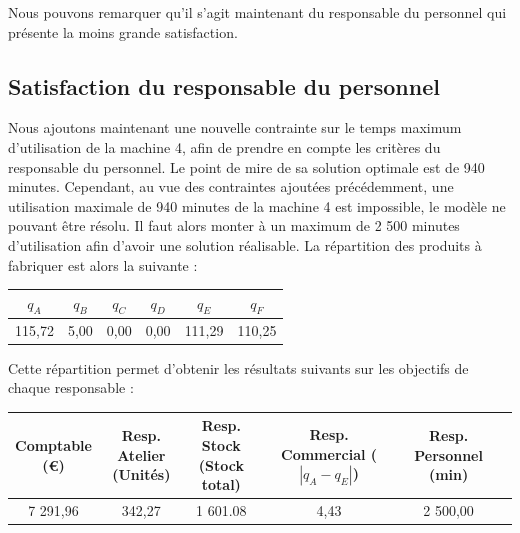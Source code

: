 \documentclass[paper=a4, fontsize=11pt]{report}
\numberwithin{equation}{section}		%
\numberwithin{figure}{section}			%
\numberwithin{table}{section}				%
\newcommand\abs[1]{\left|#1\right|}
\begin{document}
Nous pouvons remarquer qu'il s'agit maintenant du responsable du personnel qui présente la moins grande satisfaction.

\subsection{Satisfaction du responsable du personnel}

Nous ajoutons maintenant une nouvelle contrainte sur le temps maximum d'utilisation de la machine 4, afin de prendre en compte les critères du responsable du personnel. Le point de mire de sa solution optimale est de 940 minutes. Cependant, au vue des contraintes ajoutées précédemment, une utilisation maximale de 940 minutes de la machine 4 est impossible, le modèle ne pouvant être résolu. Il faut alors monter à un maximum de 2 500 minutes d'utilisation afin d'avoir une solution réalisable. La répartition des produits à fabriquer est alors la suivante :

\begin{center}
\begin{tabular}{cccccc}
\hline
$q_A$ & $q_B$ & $q_C$ & $q_D$ & $q_E$ & $q_F$ \\
\hline
115,72 & 5,00 & 0,00 & 0,00 & 111,29 & 110,25 \\
\hline
\end{tabular}
\end{center}

Cette répartition permet d'obtenir les résultats suivants sur les objectifs de chaque responsable : 

\begin{table}[H]
\begin{center}
\begin{tabular}{c|ccccc}
\shortstack{Comptable \\ \scriptsize{(€)}} & \shortstack{Resp. Atelier \\ \scriptsize (Unités)} & \shortstack{Resp.  Stock \\ \scriptsize (Stock total)} & \shortstack{Resp.  Commercial \\ \scriptsize ($\abs{q_A - q_E}$)} &   \shortstack{Resp.  Personnel \\ \scriptsize (min)} \\ 
\hline 
7 291,96 & 342,27 & 1 601.08 & 4,43 & 2 500,00 \\ 
\end{tabular}
\end{center}
\end{table}
\end{document}
